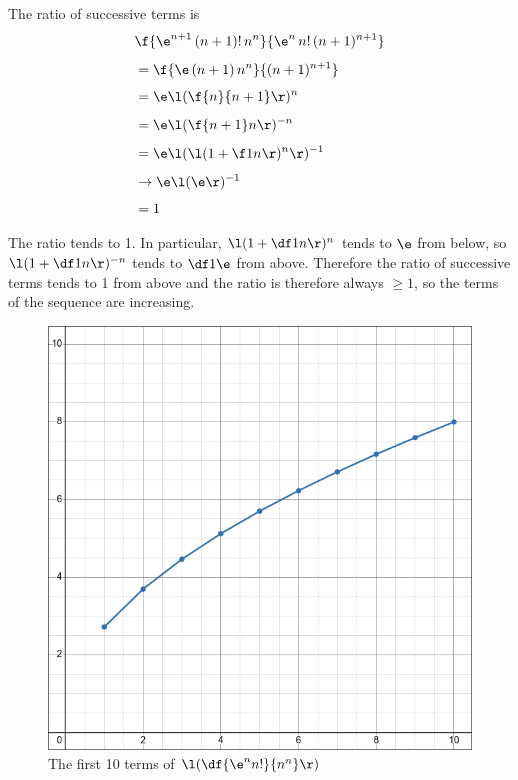 \documentclass[a4paper]{article}
\begin{document}
The ratio of successive terms is \begin{align*}
& \f{\e^{n+1}\, (n+1)!\, n^n}{\e^n\, n!\, (n+1)^{n+1}}\\[1ex]
&= \f{\e\, (n+1)\, n^n}{(n+1)^{n+1}}\\[1ex]
&= \e \l(\f{n}{n+1}\r)^n\\[1ex]
&= \e \l(\f{n+1}n\r)^{-n}\\[1ex]
&= \e \l(\l(1 + \f1n\r)^n\r)^{-1}\\[1ex]
&\to \e \l(\e\r)^{-1}\\[1ex]
&= 1
\end{align*}

The ratio tends to 1. In particular, $\l(1+\df1n\r)^n$ tends to $\e$ from below, so $\l(1+\df1n\r)^{-n}$ tends to $\df1\e$ from above. Therefore the ratio of successive terms tends to 1 from above and the ratio is therefore always $\ge 1$, so the terms of the sequence are increasing.

\begin{figure}[hbtp]
	\centering
	\includegraphics[scale=0.4]{Q4a}
	\caption{The first 10 terms of $\l(\df{\e^n n!}{n^n}\r)$}
\end{figure}
\end{document}
